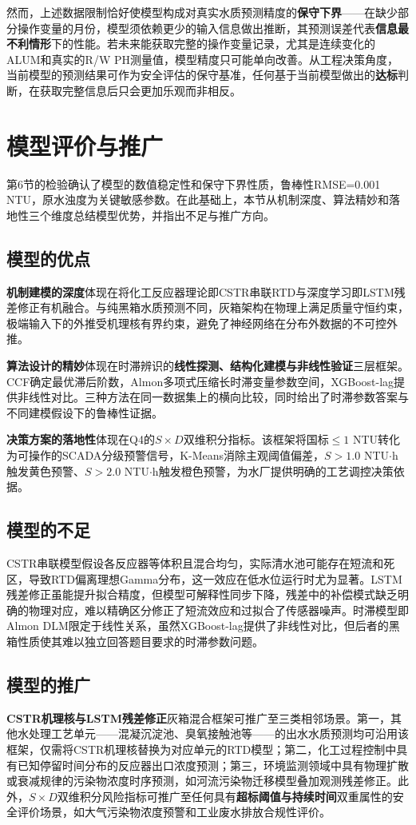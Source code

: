 \documentclass{cumcmthesis}
\begin{document}
然而，上述数据限制恰好使模型构成对真实水质预测精度的\textbf{保守下界}——在缺少部分操作变量的月份，模型须依赖更少的输入信息做出推断，其预测误差代表\textbf{信息最不利情形}下的性能。若未来能获取完整的操作变量记录，尤其是连续变化的ALUM和真实的R/W PH测量值，模型精度只可能单向改善。从工程决策角度，当前模型的预测结果可作为安全评估的保守基准，任何基于当前模型做出的\textbf{达标}判断，在获取完整信息后只会更加乐观而非相反。


\section{模型评价与推广}

第6节的检验确认了模型的数值稳定性和保守下界性质，鲁棒性RMSE=0.001 NTU，原水浊度为关键敏感参数。在此基础上，本节从机制深度、算法精妙和落地性三个维度总结模型优势，并指出不足与推广方向。

\subsection{模型的优点}
\textbf{机制建模的深度}体现在将化工反应器理论即CSTR串联RTD与深度学习即LSTM残差修正有机融合。与纯黑箱水质预测\cite{lstm,claude}不同，灰箱架构在物理上满足质量守恒约束，极端输入下的外推受机理核有界约束，避免了神经网络在分布外数据的不可控外推。

\textbf{算法设计的精妙}体现在时滞辨识的\textbf{线性探测、结构化建模与非线性验证}三层框架。CCF确定最优滞后阶数，Almon多项式压缩长时滞变量参数空间，XGBoost-lag提供非线性对比。三种方法在同一数据集上的横向比较，同时给出了时滞参数答案与不同建模假设下的鲁棒性证据。

\textbf{决策方案的落地性}体现在Q4的$S\times D$双维积分指标。该框架将国标$\le 1$ NTU转化为可操作的SCADA分级预警信号，K-Means消除主观阈值偏差，$S>1.0$ NTU$\cdot$h触发黄色预警、$S>2.0$ NTU$\cdot$h触发橙色预警，为水厂提供明确的工艺调控决策依据。

\subsection{模型的不足}
CSTR串联模型假设各反应器等体积且混合均匀，实际清水池可能存在短流和死区，导致RTD偏离理想Gamma分布，这一效应在低水位运行时尤为显著。LSTM残差修正虽能提升拟合精度，但模型可解释性同步下降，残差中的补偿模式缺乏明确的物理对应，难以精确区分修正了短流效应和过拟合了传感器噪声。时滞模型即Almon DLM限定于线性关系，虽然XGBoost-lag提供了非线性对比，但后者的黑箱性质使其难以独立回答题目要求的时滞参数问题。

\subsection{模型的推广}
\textbf{CSTR机理核与LSTM残差修正}灰箱混合框架可推广至三类相邻场景。第一，其他水处理工艺单元——混凝沉淀池、臭氧接触池等——的出水水质预测均可沿用该框架，仅需将CSTR机理核替换为对应单元的RTD模型；第二，化工过程控制中具有已知停留时间分布的反应器出口浓度预测；第三，环境监测领域中具有物理扩散或衰减规律的污染物浓度时序预测，如河流污染物迁移模型叠加观测残差修正。此外，$S\times D$双维积分风险指标可推广至任何具有\textbf{超标阈值与持续时间}双重属性的安全评价场景，如大气污染物浓度预警和工业废水排放合规性评价。
\end{document}
